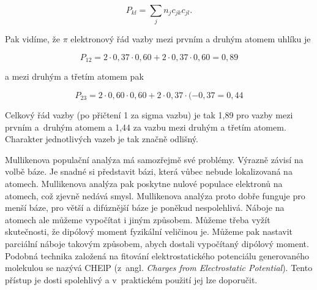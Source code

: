 \begin{priklad}
\begin{equation}
P_{kl} = \sum_j n_j c_{jk} c_{jl}.
\label{rov:Vl-14}
\end{equation}

\noindent Pak vidíme, že $\pi$ elektronový řád vazby mezi prvním a druhým atomem uhlíku je

\begin{equation}
P_{12} = 2 \cdot 0{,}37 \cdot 0{,}60 + 2 \cdot 0{,}37 \cdot 0{,}60 = 0{,}89
\end{equation}

\noindent a mezi druhým a třetím atomem pak

\begin{equation}
P_{23} = 2 \cdot 0{,}60 \cdot 0{,}60 + 2 \cdot 0{,}37 \cdot (-0{,}37 = 0{,}44 \nonumber
\end{equation}


Celkový řád vazby (po přičtení 1 za sigma vazbu) je tak 1,89 pro vazby mezi prvním a~druhým atomem a 1,44 za vazbu mezi druhým a třetím atomem. Charakter jednotlivých vazeb je tak značně odlišný.
\end{priklad}


Mullikenova populační analýza má samozřejmě své problémy. Výrazně závisí na volbě báze. Je snadné si představit bázi, která vůbec nebude lokalizovaná na atomech. Mullikenova analýza pak poskytne nulové populace elektronů na atomech, což zjevně nedává smysl. Mullikenova analýza proto dobře funguje pro menší báze, pro větší a difúznější báze je poněkud nespolehlivá. Náboje na atomech ale můžeme vypočítat i jiným způsobem. Můžeme třeba vyžít skutečnosti, že dipólový moment fyzikální veličinou je. Můžeme pak nastavit parciální náboje takovým způsobem, abych dostali vypočítaný dipólový moment. Podobná technika založená na fitování elektrostatického potenciálu generovaného molekulou se nazývá CHElP (z~angl. \textit{Charges from Electrostatic Potential}). Tento přístup je dosti spolehlivý a v~praktickém použití jej lze doporučit.



   
         
   





      

 


